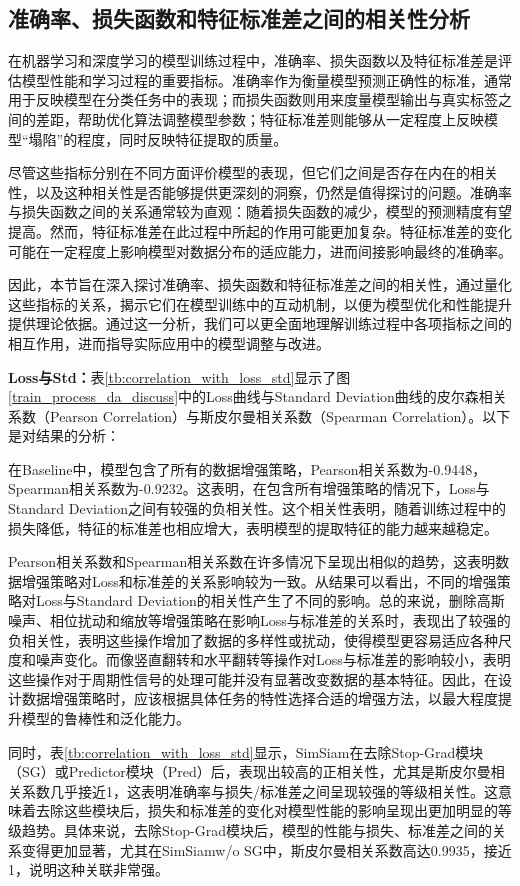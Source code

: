 \documentclass[master]{thesis-uestc}
\begin{document}
\subsection{准确率、损失函数和特征标准差之间的相关性分析}

在机器学习和深度学习的模型训练过程中，准确率、损失函数以及特征标准差是评估模型性能和学习过程的重要指标。准确率作为衡量模型预测正确性的标准，通常用于反映模型在分类任务中的表现；而损失函数则用来度量模型输出与真实标签之间的差距，帮助优化算法调整模型参数；特征标准差则能够从一定程度上反映模型“塌陷”的程度，同时反映特征提取的质量。

尽管这些指标分别在不同方面评价模型的表现，但它们之间是否存在内在的相关性，以及这种相关性是否能够提供更深刻的洞察，仍然是值得探讨的问题。准确率与损失函数之间的关系通常较为直观：随着损失函数的减少，模型的预测精度有望提高。然而，特征标准差在此过程中所起的作用可能更加复杂。特征标准差的变化可能在一定程度上影响模型对数据分布的适应能力，进而间接影响最终的准确率。

因此，本节旨在深入探讨准确率、损失函数和特征标准差之间的相关性，通过量化这些指标的关系，揭示它们在模型训练中的互动机制，以便为模型优化和性能提升提供理论依据。通过这一分析，我们可以更全面地理解训练过程中各项指标之间的相互作用，进而指导实际应用中的模型调整与改进。

\textbf{Loss与Std：}表\ref{tb:correlation_with_loss_std}显示了图\ref{train_process_da_discuss}中的Loss曲线与Standard Deviation曲线的皮尔森相关系数（Pearson Correlation）与斯皮尔曼相关系数（Spearman Correlation）。以下是对结果的分析：

在Baseline中，模型包含了所有的数据增强策略，Pearson相关系数为-0.9448，Spearman相关系数为-0.9232。这表明，在包含所有增强策略的情况下，Loss与Standard Deviation之间有较强的负相关性。这个相关性表明，随着训练过程中的损失降低，特征的标准差也相应增大，表明模型的提取特征的能力越来越稳定。

Pearson相关系数和Spearman相关系数在许多情况下呈现出相似的趋势，这表明数据增强策略对Loss和标准差的关系影响较为一致。从结果可以看出，不同的增强策略对Loss与Standard Deviation的相关性产生了不同的影响。总的来说，删除高斯噪声、相位扰动和缩放等增强策略在影响Loss与标准差的关系时，表现出了较强的负相关性，表明这些操作增加了数据的多样性或扰动，使得模型更容易适应各种尺度和噪声变化。而像竖直翻转和水平翻转等操作对Loss与标准差的影响较小，表明这些操作对于周期性信号的处理可能并没有显著改变数据的基本特征。因此，在设计数据增强策略时，应该根据具体任务的特性选择合适的增强方法，以最大程度提升模型的鲁棒性和泛化能力。

同时，表\ref{tb:correlation_with_loss_std}显示，SimSiam在去除Stop-Grad模块（SG）或Predictor模块（Pred）后，表现出较高的正相关性，尤其是斯皮尔曼相关系数几乎接近1，这表明准确率与损失/标准差之间呈现较强的等级相关性。这意味着去除这些模块后，损失和标准差的变化对模型性能的影响呈现出更加明显的等级趋势。具体来说，去除Stop-Grad模块后，模型的性能与损失、标准差之间的关系变得更加显著，尤其在SimSiamw/o SG中，斯皮尔曼相关系数高达0.9935，接近1，说明这种关联非常强。
\end{document}
